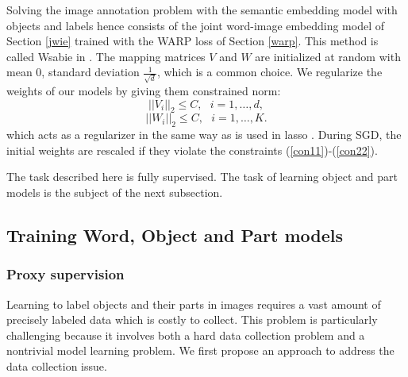 Solving the image annotation problem with the semantic embedding model with objects and labels
hence consists of the
 joint word-image embedding model of Section \ref{jwie} trained with the WARP loss of Section \ref{warp}.
This method is called {\sc Wsabie} in \cite{image-wsabie}.
The mapping matrices $V$ and $W$ are initialized at random
with mean 0, standard deviation $\frac{1}{\sqrt{d}}$, which is a common choice. 
We regularize the weights of our models by giving them constrained norm:
\begin{equation} \label{con11}
  ||V_i||_2 \leq C, ~~~ i=1,\dots,d,
\end{equation}
\begin{equation} \label{con22}
  ||W_i||_2 \leq C, ~~~ i=1,\dots,K.
\end{equation}
which acts as a regularizer in the same way as is used in lasso \cite{tibshirani1996regression}.
During SGD, the initial weights are rescaled if they violate the constraints (\ref{con11})-(\ref{con22}).

The task described here is fully supervised. 
The task of  learning object and part models is the subject of the next subsection.

\subsection{Training Word, Object and Part models}\label{sec:psup}

\subsubsection{Proxy supervision}

Learning to label objects and their parts in images requires a vast
amount of precisely labeled data which is costly to collect.  This
problem is particularly challenging because it involves both a hard
data collection problem and a nontrivial model learning problem.  We
first propose an approach to address the data collection issue.


